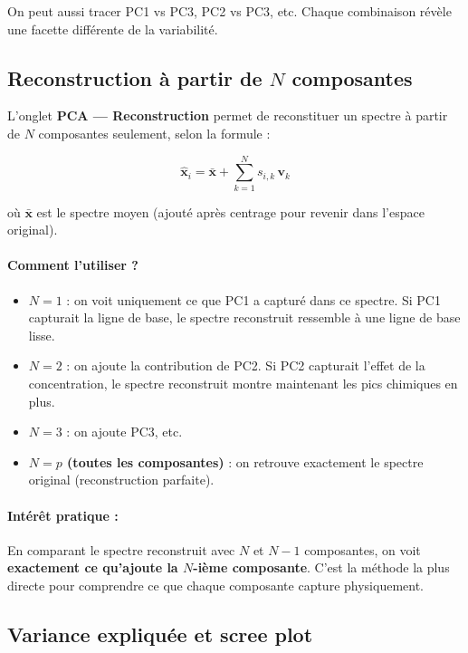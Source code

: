 \documentclass[12pt, a4paper]{article}
\newcommand{\vv}{\mathbf{v}}
\newcommand{\xbar}{\bar{\mathbf{x}}}
\begin{document}
\begin{remarque}
On peut aussi tracer PC1 vs PC3, PC2 vs PC3, etc. Chaque combinaison révèle
une facette différente de la variabilité.
\end{remarque}

\subsection{Reconstruction à partir de $N$ composantes}

L'onglet \textbf{PCA --- Reconstruction} permet de reconstituer un spectre à
partir de $N$ composantes seulement, selon la formule :

\[
\hat{\mathbf{x}}_i = \xbar + \sum_{k=1}^{N} s_{i,k}\,\vv_k
\]

où $\xbar$ est le spectre moyen (ajouté après centrage pour revenir dans
l'espace original).

\paragraph{Comment l'utiliser ?}
\begin{itemize}
  \item \textbf{$N = 1$} : on voit uniquement ce que PC1 a capturé dans ce
        spectre. Si PC1 capturait la ligne de base, le spectre reconstruit
        ressemble à une ligne de base lisse.

  \item \textbf{$N = 2$} : on ajoute la contribution de PC2. Si PC2 capturait
        l'effet de la concentration, le spectre reconstruit montre maintenant
        les pics chimiques en plus.

  \item \textbf{$N = 3$} : on ajoute PC3, etc.

  \item \textbf{$N = p$ (toutes les composantes)} : on retrouve exactement le
        spectre original (reconstruction parfaite).
\end{itemize}

\paragraph{Intérêt pratique :}
En comparant le spectre reconstruit avec $N$ et $N-1$ composantes, on voit
\textbf{exactement ce qu'ajoute la $N$-ième composante}. C'est la méthode la
plus directe pour comprendre ce que chaque composante capture physiquement.

\subsection{Variance expliquée et scree plot}
\end{document}
